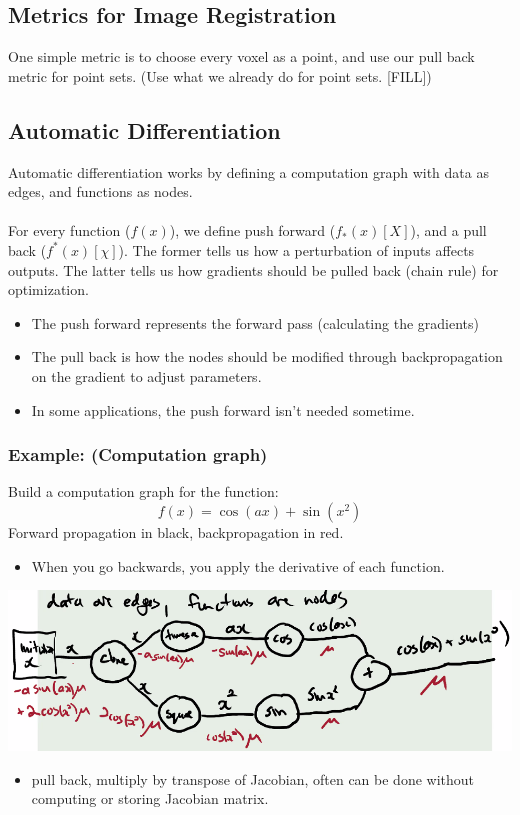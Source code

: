 \documentclass[10pt]{article}
\begin{document}
\subsection*{Metrics for Image Registration}
One simple metric is to choose every voxel as a point, and use our pull back metric for point sets.  (Use what we already do for point sets.  [FILL])

\subsection*{Automatic Differentiation}
Automatic differentiation works by defining a computation graph with data as edges, and functions as nodes.\\\\
For every function ($f(x)$), we define push forward ($f_*(x)[X]$), and a pull back ($f^*(x)[\chi]$).  The former tells us how a perturbation of inputs affects outputs.  The latter tells us how gradients should be pulled back (chain rule) for optimization.
\begin{itemize}
	\item The push forward represents the forward pass (calculating the gradients)
	\item The pull back is how the nodes should be modified through backpropagation on the gradient to adjust parameters.
	\item In some applications, the push forward isn't needed sometime.
\end{itemize}

\subsubsection*{Example: (Computation graph)}
Build a computation graph for the function:
\[f(x) = \cos(ax) + \sin(x^2)\]
Forward propagation in black, backpropagation in red.
\begin{itemize}
	\item When you go backwards, you apply the derivative of each function.
\end{itemize}
\begin{center} 
	\includegraphics*[width=\textwidth]{W8_1.png} 
\end{center}
\begin{itemize}
	\item pull back, multiply by transpose of Jacobian, often can be done without computing or storing Jacobian matrix.
\end{itemize}
\end{document}
